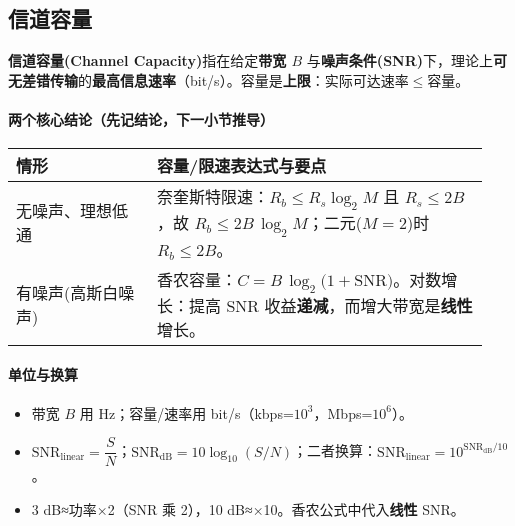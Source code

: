 \documentclass[lang=cn,newtx,10pt,scheme=chinese]{../../elegantbook}
\begin{document}
\begin{center}
{\setlength{\fboxsep}{6pt}%
}%
\end{center}
\subsection{信道容量}
    \textbf{信道容量(Channel Capacity)}指在给定\textbf{带宽 $B$} 与\textbf{噪声条件(SNR)}下，理论上\textbf{可无差错传输}的\textbf{最高信息速率}（bit/s）。容量是\textbf{上限}：实际可达速率$\le$容量。

\paragraph{两个核心结论（先记结论，下一小节推导）}

{\small\begin{longtable}{|p{0.28\linewidth}|p{0.66\linewidth}|}
\hline
	\textbf{情形} & \textbf{容量/限速表达式与要点} \\
\hline
无噪声、理想低通 & 奈奎斯特限速：$R_b\le R_s\log_2 M$ 且 $R_s\le 2B$，故 $\boxed{R_b\le 2B\,\log_2 M}$；二元($M=2$)时 $R_b\le 2B$。\\
\hline
有噪声(高斯白噪声) & 香农容量：$\boxed{C=B\,\log_2\!\bigl(1+\mathrm{SNR}\bigr)}$。对数增长：提高 SNR 收益\textbf{递减}，而增大带宽是\textbf{线性}增长。\\
\hline
\end{longtable}}

\paragraph{单位与换算}
\begin{itemize}
    \item 带宽 $B$ 用 Hz；容量/速率用 bit/s（kbps=$10^3$，Mbps=$10^6$）。
    \item $\mathrm{SNR}_{\mathrm{linear}}=\dfrac{S}{N}$；$\mathrm{SNR}_{\mathrm{dB}}=10\log_{10}(S/N)$；二者换算：$\mathrm{SNR}_{\mathrm{linear}}=10^{\mathrm{SNR}_{\mathrm{dB}}/10}$。
    \item 3 dB≈功率×2（SNR 乘 2），10 dB≈×10。香农公式中代入\textbf{线性} SNR。
\end{itemize}
\end{document}
